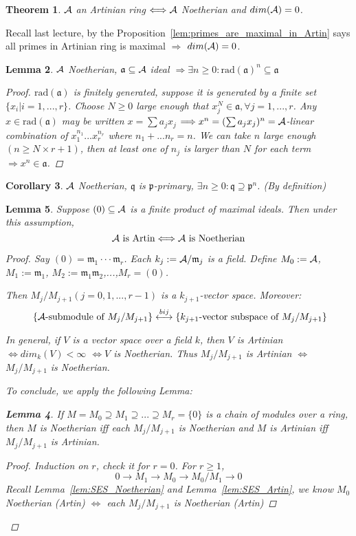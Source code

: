 \documentclass[11pt]{article}
\newtheorem{thm}{Theorem}[section]
\newtheorem{lemma}[thm]{Lemma}
\newtheorem{cor}[thm]{Corollary}
\newcommand{\sca}{{\mathfrak a}}
\newcommand{\scm}{{\mathfrak m}}
\newcommand{\scp}{{\mathfrak p}}
\newcommand{\scq}{\mathfrak q}
\newcommand{\cala}{{\cal A}}
\newcommand{\Lrta}{\Longrightarrow}
\newcommand{\lrta}{\longrightarrow}
\newcommand{\llrta}{\longleftrightarrow}
\newcommand{\Llrta}{\Longleftrightarrow}
\begin{document}
\begin{thm}\label{thm:Artin_equiv_Noetherin+dim=0}
$\cala$ an Artinian   ring $\Llrta\cala$ Noetherian and $dim(\cala)=0$.  
\end{thm}
Recall last lecture, by the Proposition~\ref{lem:primes_are_maximal_in_Artin} says all primes in Artinian   ring is maximal $\Lrta$ $dim(\cala)=0$.

\begin{lemma}\label{lem:ideal_radical_Noetherian}
$\cala$ Noetherian, $\sca\subseteq \cala$ ideal $\Lrta \exists n\geq 0: \text{rad}(\sca)^n\subseteq \sca$
\begin{proof}
$\text{rad}(\sca)$ is finitely generated, suppose it is generated by a finite set $\{x_i|i=1,...,r\}$. Choose $N\geq 0$ large enough that $x_j^N\in\sca,\forall j=1,...,r$. Any $x\in \text{rad}(\sca)$ may be written $x=\sum a_j x_j$ $\Lrta x^n=(\sum a_j x_j)^n=\cala$-linear combination of $x_1^{n_1}...x_r^{n_r} $ where $n_1+...n_r=n$. We can take $n$ large enough $(n\geq N\times r+1)$, then at least one of $n_j$ is larger than $N$ for each term $\Lrta x^n\in\sca$.
\end{proof}
\end{lemma}

\begin{cor}
$\cala$ Noetherian, $\scq$  is $\scp$-primary, $\exists n\geq 0:\scq\supseteq \scp^n$. (By definition)
\end{cor}

\begin{lemma}\label{lem:Artin_Noetherin_product_of_maximals}
Suppose $(0)\subseteq \cala$ is a finite product of maximal ideals. Then under this assumption, 
$$
\cala\text{ is Artin}\Llrta \cala\text{ is Noetherian}
$$
\begin{proof}
Say $(0)=\scm_1\cdot \cdot \cdot \scm_r$. Each $k_j:=\cala/\scm_j$ is a field. Define $M_0:=\cala$, $M_1:=\scm_1$, $M_2:=\scm_1\scm_2$,...,$M_r=(0)$.

Then $M_j/M_{j+1} (j=0,1,...,r-1)$ is a $k_{j+1}$-vector space. Moreover: 
$$
\text{
\{$\cala$-submodule of $M_j/M_{j+1}$\}}
\overset{bij}{\llrta}
\text{\{$k_{j+1}$-vector subspace of $M_j/M_{j+1}$\}}
$$

In general, if $V$ is a vector space over a field $k$, then $V$ is Artinian   $\Llrta dim_k(V)<\infty$ $\Llrta V$ is Noetherian. Thus $M_j/M_{j+1}$ is Artinian   $\Llrta$ $M_j/M_{j+1}$ is Noetherian.

To conclude, we apply the following Lemma:
\begin{lemma}
If $M=M_0\supseteq M_1\supseteq ...\supseteq M_r=\{0\}$ is a chain of modules over a ring, then $M$ is Noetherian iff each $M_j/M_{j+1}$ is Noetherian and $M$ is Artinian   iff $M_j/M_{j+1}$ is Artinian. 
\begin{proof}
Induction on $r$, check it for $r=0$.
For $r\geq 1$, 
$$
0\lrta M_1\lrta M_0\lrta M_0/M_1\lrta 0
$$ Recall Lemma~\ref{lem:SES_Noetherian} and Lemma~\ref{lem:SES_Artin}, we know $M_0$ Noetherian (Artin) $\Llrta$ each $M_j/M_{j+1}$ is Noetherian (Artin)
\end{proof}
\end{lemma}
\end{proof}
\end{lemma}
\end{document}
